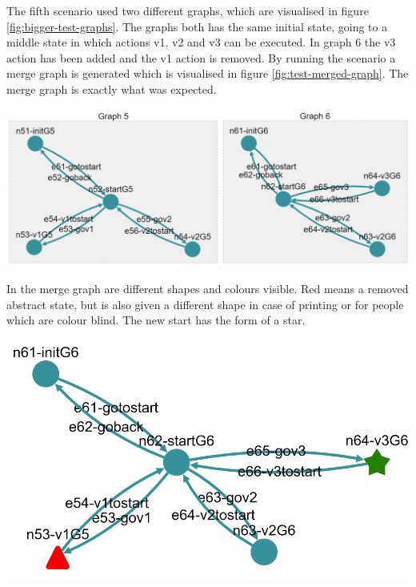 The fifth scenario used two different graphs, which are visualised in figure \ref{fig:bigger-test-graphs}. The graphs both has the same initial state, going to a middle state in which actions v1, v2 and v3 can be executed. In graph 6 the v3 action has been added and the v1 action is removed. By running the scenario a merge graph is generated which is visualised in figure \ref{fig:test-merged-graph}. The merge graph is exactly what was expected. 

\begingroup
\captionsetup{type=figure}
\includegraphics[scale=0.5]{images/6-test-graph-5-6.png}
\label{fig:bigger-test-graphs}
\endgroup

In the merge graph are different shapes and colours visible. Red means a removed abstract state, but is also given a different shape in case of printing or for people which are colour blind. The new start has the form of a star. 

\begingroup
\captionsetup{type=figure}
\includegraphics[scale=0.5]{images/6-merge-result.png}
\label{fig:test-merged-graph}
\endgroup


